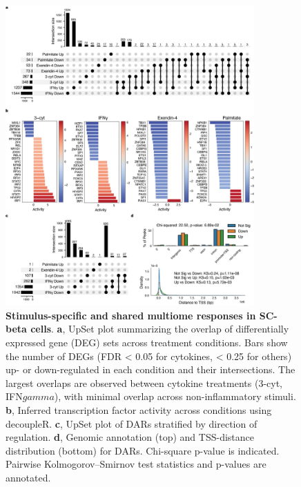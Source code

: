 \begin{figure}[p]
    \centering
    \includegraphics[width=0.85\textwidth]{3_figures-and-files/ExtendedFig3.png}
    \caption[Stimulus-specific and shared SC-beta cell responses]{\textbf{Stimulus-specific and shared multiome responses in SC-beta cells}. \textbf{a}, UpSet plot summarizing the overlap of differentially expressed gene (DEG) sets across treatment conditions. Bars show the number of DEGs (FDR < 0.05 for cytokines, < 0.25 for others) up- or down-regulated in each condition and their intersections. The largest overlaps are observed between cytokine treatments (3-cyt, IFN$gamma$), with minimal overlap across non-inflammatory stimuli. \textbf{b}, Inferred transcription factor activity across conditions using decoupleR. \textbf{c}, UpSet plot of DARs stratified by direction of regulation. \textbf{d}, Genomic annotation (top) and TSS-distance distribution (bottom) for DARs. Chi-square p-value is indicated. Pairwise Kolmogorov–Smirnov test statistics and p-values are annotated.}
    \label{fig:3 supplementary_3}
\end{figure}

